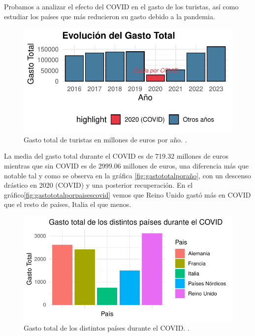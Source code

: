\documentclass[data,article,submit,moreauthors,pdftex]{Definitions/mdpi}
\begin{document}
Probamos a analizar el efecto del COVID en el gasto de los turistas, así
como estudiar los países que más reducieron su gasto debido a la
pandemia.

\begin{figure}[H]
\includegraphics{ProyectoAED2024_Rmd_files/figure-latex/gasto total covid-1} \caption{Gasto total de turistas en millones de euros por año. .\label{fig:gastototalporaño}}\label{fig:gasto total covid}
\end{figure}

La media del gasto total durante el COVID es de 719.32 millones de euros
mientras que sin COVID es de 2999.06 millones de euros, una diferencia
más que notable tal y como se observa en la gráfica
\ref{fig:gastototalporaño}, con un descenso drástico en 2020 (COVID) y
una posterior recuperación. En el
gráfico\ref{fig:gastototalporpaisescovid} vemos que Reino Unido gastó
más en COVID que el resto de países, Italia el que menos.

\begin{figure}[H]
\includegraphics{ProyectoAED2024_Rmd_files/figure-latex/gasto paises covid-1} \caption{Gasto total de los distintos países durante el COVID. .\label{fig:gastototalporpaisescovid}}\label{fig:gasto paises covid}
\end{figure}
\end{document}
